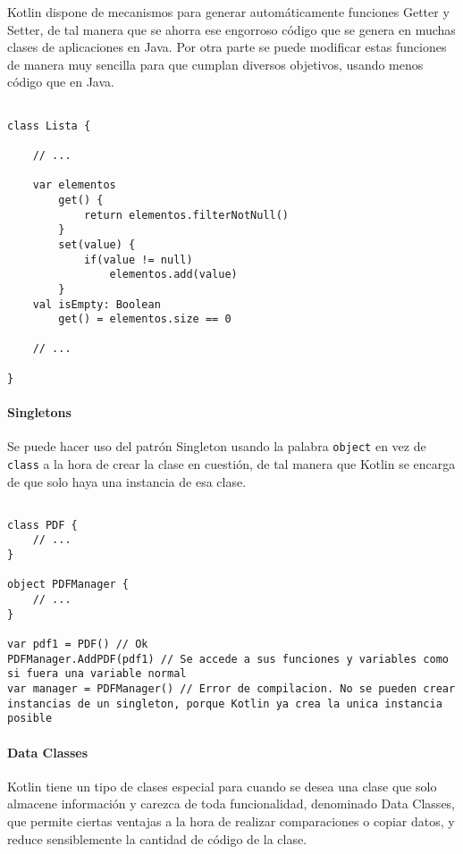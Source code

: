 Kotlin dispone de mecanismos para generar automáticamente funciones Getter y Setter, de tal manera que se ahorra ese engorroso código que se genera en muchas clases de aplicaciones en Java. Por otra parte se puede modificar estas funciones de manera muy sencilla para que cumplan diversos objetivos, usando menos código que en Java.

\begin{verbatim}

class Lista {

	// ...
	
	var elementos
		get() {
			return elementos.filterNotNull()
		}
		set(value) {
			if(value != null)
				elementos.add(value)
		}
	val isEmpty: Boolean
		get() = elementos.size == 0
	
	// ...

}
\end{verbatim}

\paragraph{Singletons}
Se puede hacer uso del patrón Singleton usando la palabra \texttt{object} en vez de \texttt{class} a la hora de crear la clase en cuestión, de tal manera que Kotlin se encarga de que solo haya una instancia de esa clase.

\begin{verbatim}

class PDF {
	// ...
}

object PDFManager {
	// ...
}

var pdf1 = PDF() // Ok
PDFManager.AddPDF(pdf1) // Se accede a sus funciones y variables como si fuera una variable normal
var manager = PDFManager() // Error de compilacion. No se pueden crear instancias de un singleton, porque Kotlin ya crea la unica instancia posible

\end{verbatim}

\paragraph{Data Classes}

Kotlin tiene un tipo de clases especial para cuando se desea una clase que solo almacene información y carezca de toda funcionalidad, denominado Data Classes, que permite ciertas ventajas a la hora de realizar comparaciones o copiar datos, y reduce sensiblemente la cantidad de código de la clase.


